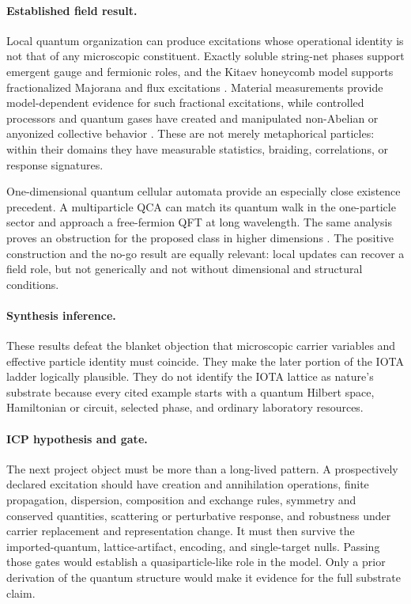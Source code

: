 \paragraph{Established field result.}
Local quantum organization can produce excitations whose operational identity
is not that of any microscopic constituent.  Exactly soluble string-net phases
support emergent gauge and fermionic roles, and the Kitaev honeycomb model
supports fractionalized Majorana and flux excitations
\citep{LevinWen2005StringNet,Kitaev2006Anyons}.  Material measurements provide
model-dependent evidence for such fractional excitations, while controlled
processors and quantum gases have created and manipulated non-Abelian or
anyonized collective behavior
\citep{JansaEtAl2018Fractional,IqbalEtAl2024NonAbelian,
DharEtAl2025Anyonization}.  These are not merely metaphorical particles: within
their domains they have measurable statistics, braiding, correlations, or
response signatures.

One-dimensional quantum cellular automata provide an especially close
existence precedent.  A multiparticle QCA can match its quantum walk in the
one-particle sector and approach a free-fermion QFT at long wavelength.  The
same analysis proves an obstruction for the proposed class in higher
dimensions \citep{MlodinowBrun2020QCAQFT}.  The positive construction and the
no-go result are equally relevant: local updates can recover a field role, but
not generically and not without dimensional and structural conditions.

\paragraph{Synthesis inference.}
These results defeat the blanket objection that microscopic carrier variables
and effective particle identity must coincide.  They make the later portion of
the IOTA ladder logically plausible.  They do not identify the IOTA lattice as
nature's substrate because every cited example starts with a quantum Hilbert
space, Hamiltonian or circuit, selected phase, and ordinary laboratory
resources.

\paragraph{ICP hypothesis and gate.}
The next project object must be more than a long-lived pattern.  A
prospectively declared excitation should have creation and annihilation
operations, finite propagation, dispersion, composition and exchange rules,
symmetry and conserved quantities, scattering or perturbative response, and
robustness under carrier replacement and representation change.  It must then
survive the imported-quantum, lattice-artifact, encoding, and single-target
nulls.  Passing those gates would establish a quasiparticle-like role in the
model.  Only a prior derivation of the quantum structure would make it evidence
for the full substrate claim.

